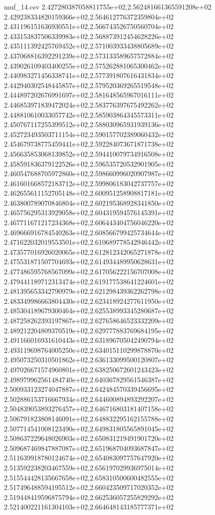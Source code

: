 \begin{filecontents*}{muf_14.csv}
2.427280387058811755e+02,2.562481661365591208e+02
2.429238334820159366e+02,2.564612776372359804e+02
2.431196151636930551e+02,2.566743526750560704e+02
2.433153837506339983e+02,2.568873912454628226e+02
2.435111392425769452e+02,2.571003933438805689e+02
2.437068816392291239e+02,2.573133589657572884e+02
2.439026109403400255e+02,2.575262881065300462e+02
2.440983271456338741e+02,2.577391807616431834e+02
2.442940302548445857e+02,2.579520369265519548e+02
2.444897202676991697e+02,2.581648565967016111e+02
2.446853971839472024e+02,2.583776397675492262e+02
2.448810610033057742e+02,2.585903864345573311e+02
2.450767117255399512e+02,2.588030965931939136e+02
2.452723493503711154e+02,2.590157702389060432e+02
2.454679738775459441e+02,2.592284073671871738e+02
2.456635853068139852e+02,2.594410079734916508e+02
2.458591836379122526e+02,2.596535720532901905e+02
2.460547688705972860e+02,2.598660996020907987e+02
2.461601668572183712e+02,2.599806183042737757e+02
2.462655611152705148e+02,2.600951258908817181e+02
2.463800789070846804e+02,2.602195368928341850e+02
2.465756295313929058e+02,2.604319594576145391e+02
2.467711671217234368e+02,2.606443404756046220e+02
2.469666916784540263e+02,2.608566799425734644e+02
2.471622032019553501e+02,2.610689778542946442e+02
2.473577016926020065e+02,2.612812342065271878e+02
2.475531871507704693e+02,2.614934489950628631e+02
2.477486595768567099e+02,2.617056222156707008e+02
2.479441189712313474e+02,2.619177538641224601e+02
2.481395653342790979e+02,2.621298439362262798e+02
2.483349986663804430e+02,2.623418924277611950e+02
2.485304189679300464e+02,2.625538993345280687e+02
2.487258262393197867e+02,2.627658646523332209e+02
2.489212204809370519e+02,2.629777883769684195e+02
2.491166016931610443e+02,2.631896705042490794e+02
2.493119698764005250e+02,2.634015110299878870e+02
2.495073250310501862e+02,2.636133099500120807e+02
2.497026671574960801e+02,2.638250672601243423e+02
2.498979962561484740e+02,2.640367829561546387e+02
2.500933123274047887e+02,2.642484570339456695e+02
2.502886153716667934e+02,2.644600894893292207e+02
2.504839053893276457e+02,2.646716803181407158e+02
2.506791823808146091e+02,2.648832295162155788e+02
2.507714541008123490e+02,2.649831805565891045e+02
2.508637229648026903e+02,2.650831219491901720e+02
2.509687469847887087e+02,2.651968704093687847e+02
2.511639918780124674e+02,2.654083097757647920e+02
2.513592238203467559e+02,2.656197029936975014e+02
2.515544428135667658e+02,2.658310500600482555e+02
2.517496488594195512e+02,2.660423509717020352e+02
2.519448419596875794e+02,2.662536057255829292e+02
2.521400221161304103e+02,2.664648143185777371e+02

\end{filecontents*}
